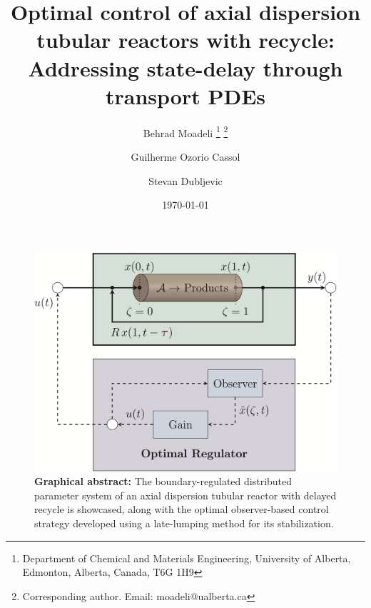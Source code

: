 \documentclass[letterpaper,12pt]{article}
\title{Optimal control of axial dispersion tubular reactors with recycle: Addressing state-delay through transport PDEs}
\author{
  Behrad Moadeli \thanks{Department of Chemical and Materials Engineering, University of Alberta, Edmonton, Alberta, Canada, T6G 1H9} \thanks{Corresponding author. Email: moadeli@ualberta.ca} \and
  Guilherme Ozorio Cassol\footnotemark[1] \and
  Stevan Dubljevic \footnotemark[1] 
  }
\date{\today}
\begin{document}
\maketitle

\begin{figure}[htbp!]
  \centering
  \includegraphics*[width=\textwidth]{Figures/abstract_final.PNG}
  \caption*{\textbf{Graphical abstract:}
  The boundary-regulated distributed parameter system of an axial dispersion tubular reactor with delayed recycle is showcased, along with the optimal observer-based control strategy developed using a late-lumping method for its stabilization.}
\end{figure}
\end{document}
